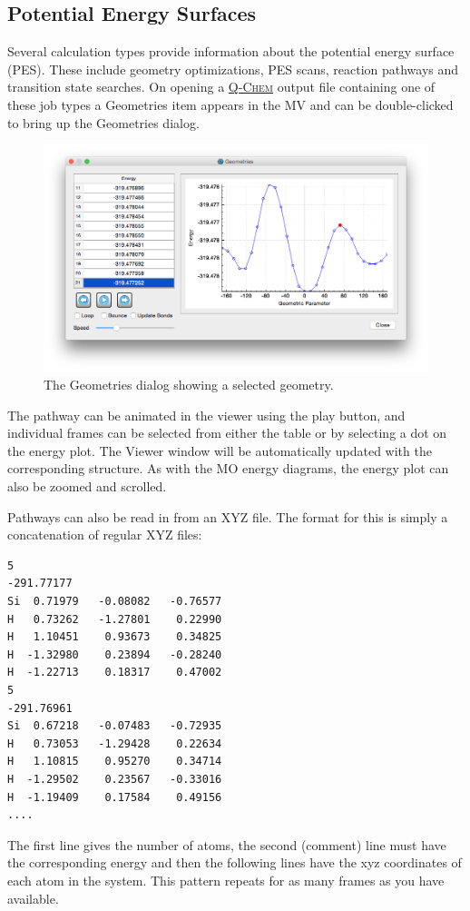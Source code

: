 \documentclass[a4paper,12pt]{article}
\newcommand{\qchem}{\href{http://q-chem.com}{{\scshape Q-Chem}}}
\begin{document}
\subsection{Potential Energy Surfaces}

Several calculation types provide information about the potential energy
surface (PES).  These include geometry optimizations, PES scans, reaction
pathways and transition state searches.  On opening a \qchem{} output file
containing one of these job types a Geometries item appears in the MV and can
be double-clicked to bring up the Geometries dialog.
\begin{figure}[h]
\begin{center}
\includegraphics[scale=0.35]{figures/PesScan.png}
\caption{The Geometries dialog showing a selected geometry. }
\end{center}
\end{figure}

The pathway can be animated in the viewer using the play button, and individual
frames can be selected from either the table or by selecting a dot on the
energy plot.  The Viewer window will be automatically updated with the
corresponding structure.  As with the MO energy diagrams, the energy plot can
also be zoomed and scrolled.

Pathways can also be read in from an XYZ file.  The format for this is simply a
concatenation of regular XYZ files:
{\footnotesize
\begin{verbatim}
5
-291.77177
Si  0.71979   -0.08082   -0.76577  
H   0.73262   -1.27801    0.22990   
H   1.10451    0.93673    0.34825   
H  -1.32980    0.23894   -0.28240  
H  -1.22713    0.18317    0.47002   
5
-291.76961
Si  0.67218   -0.07483   -0.72935  
H   0.73053   -1.29428    0.22634   
H   1.10815    0.95270    0.34714   
H  -1.29502    0.23567   -0.33016  
H  -1.19409    0.17584    0.49156 
....
\end{verbatim}
}
The first line gives the number of atoms, the second (comment) line must have
the corresponding energy and then the following lines have the xyz coordinates
of each atom in the system.  This pattern repeats for as many frames as you have
available.
\end{document}
